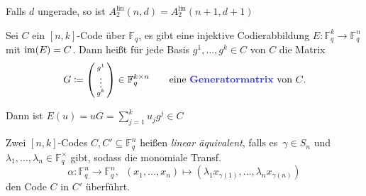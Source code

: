 \documentclass{cheat-sheet}
\newcommand{\F}{\mathbb{F}} %
\newcommand{\lin}{\text{lin}} %
\begin{document}
\begin{satz}
  Falls $d$ ungerade, so ist $A_2^\lin(n, d) = A_2^\lin(n+1, d+1)$
\end{satz}




\begin{defn}
  Sei $C$ ein $[n,k]$-Code über $\F_q$, \dh{} es gibt eine injektive Codierabbildung $E : \F_q^k \to \F_q^n$ mit $\operatorname{im}(E) = C$.
  Dann heißt für jede Basis $g^1, \ldots, g^k \in C$ von $C$ die Matrix
  \[
    G \coloneqq \begin{psmallmatrix}
      g^1 \\ \vdots \\ g^k
    \end{psmallmatrix} \in \F_q^{k \times n} \qquad
    \text{eine \emph{Generatormatrix} von $C$.}
  \]
\end{defn}

\begin{bem}
  Dann ist $E(u) = uG = \sum_{j=1}^k u_j g^j \in C$
\end{bem}


\begin{defn}
  Zwei $[n,k]$-Codes $C, C' \subseteq \F_q^n$ heißen \emph{linear äquivalent}, falls es~$\gamma \in S_n$ und $\lambda_1, \ldots, \lambda_n \in \F_q^{\times}$ gibt, sodass die monomiale Transf. \[ \alpha : \F_q^n \to \F_q^n, \enspace (x_1, \ldots, x_n) \mapsto (\lambda_1 x_{\gamma(1)}, \ldots, \lambda_n x_{\gamma(n)}) \]
  den Code $C$ in $C'$ überführt.
\end{defn}

\iffalse
\begin{bspe}
  binäre $[5, 2, 3]$-Codes
  
  $C_1$ hat Generatormatrix $G_1 = \begin{psmallmatrix}
    11100 \\
    00111
  \end{psmallmatrix}$,
  $C_1 = \{ 00000, 111100, 00111, 11011 \}$
  
  $C_2$ hat Generatormatrix $G_2 = \begin{psmallmatrix}
    011001 \\
    10110
  \end{psmallmatrix}$
  $C_2 = \{ 00000, 01101, 10110, 11011 \}$
\end{bspe}
\fi
\end{document}
